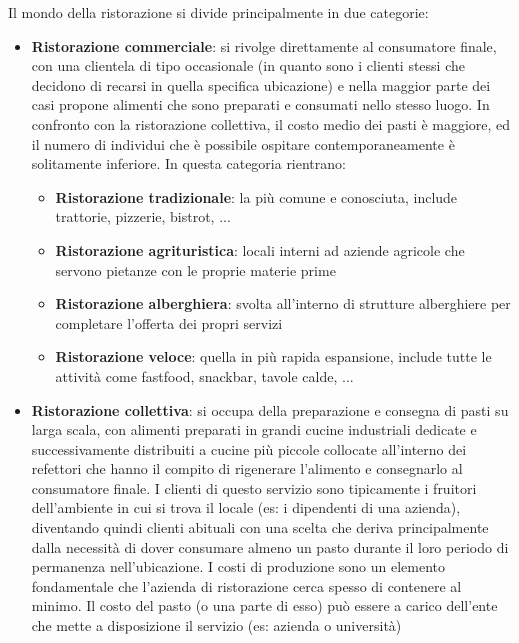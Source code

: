 \documentclass[a4paper, titlepage, 12pt, openright, twoside]{book}
\begin{document}
Il mondo della ristorazione si divide principalmente in due categorie:
\begin{itemize}
	\item \textbf{Ristorazione commerciale}: si rivolge direttamente al consumatore finale, con una clientela di tipo occasionale
											 (in quanto sono i clienti stessi che decidono di recarsi in quella specifica ubicazione) e nella maggior parte dei casi
											 propone alimenti che sono preparati e consumati nello stesso luogo. In confronto con la ristorazione collettiva,
											 il costo medio dei pasti è maggiore, ed il numero di individui che è possibile ospitare contemporaneamente è solitamente inferiore.
											 In questa categoria rientrano:
											 \begin{itemize}
											 	\item \textbf{Ristorazione tradizionale}: la più comune e conosciuta, include trattorie, pizzerie, bistrot, ...
											 	\item \textbf{Ristorazione agrituristica}: locali interni ad aziende agricole che servono pietanze con le proprie materie prime
											 	\item \textbf{Ristorazione alberghiera}: svolta all'interno di strutture alberghiere per completare l'offerta dei propri servizi
											 	\item \textbf{Ristorazione veloce}: quella in più rapida espansione, include tutte le attività 
											 										come fastfood, snackbar, tavole calde, ...
											 \end{itemize}
	\item \textbf{Ristorazione collettiva}: si occupa della preparazione e consegna di pasti su larga scala, con alimenti preparati in grandi cucine industriali dedicate e
											successivamente distribuiti a cucine più piccole collocate all'interno dei refettori che hanno il compito di rigenerare l'alimento
											e consegnarlo al consumatore finale. I clienti di questo servizio sono tipicamente i fruitori dell'ambiente in cui si trova il locale
											(es: i dipendenti di una azienda), diventando quindi clienti abituali con una scelta che deriva principalmente 
											dalla necessità di dover consumare almeno un pasto durante il loro periodo di permanenza nell'ubicazione. 
											I costi di produzione sono un elemento fondamentale che l'azienda di ristorazione cerca spesso di contenere al minimo.
											Il costo del pasto (o una parte di esso) può essere a carico dell'ente che mette a disposizione il servizio (es: azienda o università)

\end{itemize}
\end{document}
